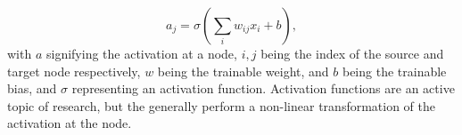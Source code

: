 \begin{equation}
    a_{j} = \sigma \left(\sum_i w_{ij} x_{i} + b\right),
\end{equation}
with $a$ signifying the activation at a node, $i,j$ being the index of the source and target node respectively, $w$ being the trainable weight, and $b$ being the trainable bias, and $\sigma$ representing an activation function. Activation functions are an active topic of research, but the generally perform a non-linear transformation of the activation at the node.

\begin{figure}[H]
    \centering
    \\

\end{figure}
